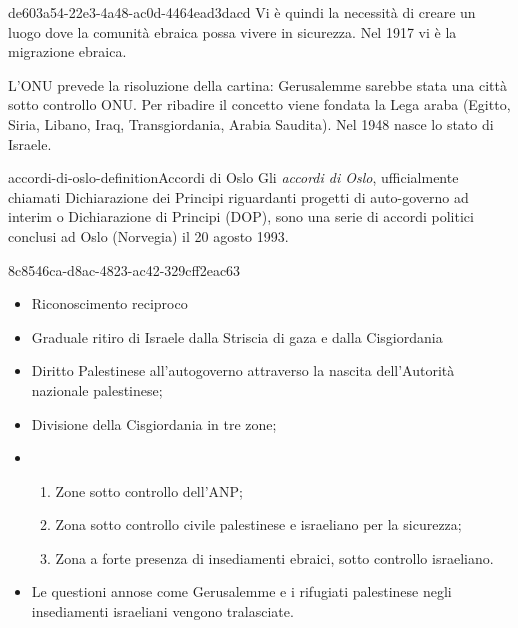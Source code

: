 \documentclass[preview]{standalone}
\begin{document}
\begin{snippet}{de603a54-22e3-4a48-ac0d-4464ead3dacd}
    Vi è quindi la necessità di creare un luogo dove la comunità ebraica possa vivere in sicurezza.
    Nel 1917 vi è la migrazione ebraica.
    
    L'ONU prevede la risoluzione della cartina:
    Gerusalemme sarebbe stata una città sotto controllo ONU.
    Per ribadire il concetto viene fondata la Lega araba
    (Egitto, Siria, Libano, Iraq, Transgiordania, Arabia Saudita).
    Nel 1948 nasce lo stato di Israele. 
    
\end{snippet}

\begin{snippetdefinition}{accordi-di-oslo-definition}{Accordi di Oslo}
    Gli \textit{accordi di Oslo}, ufficialmente chiamati Dichiarazione dei
    Principi riguardanti progetti di auto-governo ad interim o
    Dichiarazione di Principi (DOP), sono una serie di accordi
    politici conclusi ad Oslo (Norvegia) il 20 agosto 1993.
\end{snippetdefinition}

\begin{snippet}{8c8546ca-d8ac-4823-ac42-329cff2eac63}
    \begin{itemize}
        \item Riconoscimento reciproco
        \item Graduale ritiro di Israele dalla Striscia di gaza e dalla Cisgiordania
        \item Diritto Palestinese all'autogoverno attraverso la nascita dell'Autorità nazionale palestinese;
        \item Divisione della Cisgiordania in tre zone;
        \item \begin{enumerate}
            \item Zone sotto controllo dell'ANP;
            \item Zona sotto controllo civile palestinese e israeliano per la sicurezza;
            \item Zona a forte presenza di insediamenti ebraici, sotto controllo israeliano.
        \end{enumerate}
        \item Le questioni annose come Gerusalemme e i rifugiati palestinese negli insediamenti israeliani vengono tralasciate.
    \end{itemize}
\end{snippet}
\end{document}
